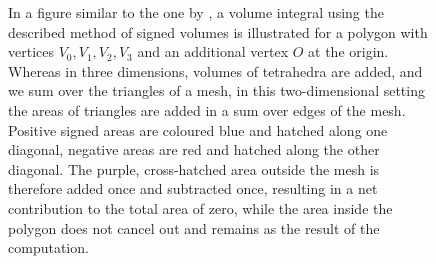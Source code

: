 \documentclass[oneside, a4paper]{book}
\begin{document}
  \begin{figure}
    \centering
    \caption{In a figure similar to the one by \autocite[Zhang and Chen]{efficient-feature-extraction}, a volume integral using the described method of signed volumes is illustrated for a polygon with vertices $V_0,V_1,V_2,V_3$ and an additional vertex $O$ at the origin. Whereas in three dimensions, volumes of tetrahedra are added, and we sum over the triangles of a mesh, in this two-dimensional setting the areas of triangles are added in a sum over edges of the mesh. Positive signed areas are coloured blue and hatched along one diagonal, negative areas are red and hatched along the other diagonal. The purple, cross-hatched area outside the mesh is therefore added once and subtracted once, resulting in a net contribution to the total area of zero, while the area inside the polygon does not cancel out and remains as the result of the computation.}
    \label{fig:volume-integral-triangle-mesh}
  \end{figure}
\end{document}
